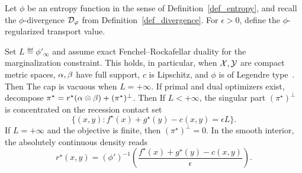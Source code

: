 Let $\phi$ be an entropy function in the sense of Definition~\ref{def_entropy}, and recall the $\phi$-divergence $\mathcal{D}_\varphi$ from Definition~\ref{def_divergence}. For $\epsilon>0$, define the $\phi$-regularized transport value.
\begin{defn}\label{def-phi-regularized-ot}
\end{defn}

\begin{prop}\label{prop-phi-regularized-ot-dual}
	Set $L\eqdef\phi'_\infty$ and assume exact Fenchel--Rockafellar duality for the marginalization constraint. This holds, in particular, when $\mathcal{X},\mathcal{Y}$ are compact metric spaces, $\alpha,\beta$ have full support, $c$ is Lipschitz, and $\phi$ is of Legendre type~\cite{TerjekGonzalezSanchez2022}. Then
	The cap is vacuous when $L=+\infty$. If primal and dual optimizers exist, decompose
	$\pi^\star=r^\star(\alpha\otimes\beta)+(\pi^\star)^\perp$. Then
	If $L<+\infty$, the singular part $(\pi^\star)^\perp$ is concentrated on the recession contact set
	\[
		\{(x,y):f^\star(x)+g^\star(y)-c(x,y)=\epsilon L\}.
	\]
	If $L=+\infty$ and the objective is finite, then $(\pi^\star)^\perp=0$. In the smooth interior, the absolutely continuous density reads
	\[
		r^\star(x,y)
		=
		(\phi')^{-1}
		\!\left(\frac{f^\star(x)+g^\star(y)-c(x,y)}{\epsilon}\right).
	\]
\end{prop}

